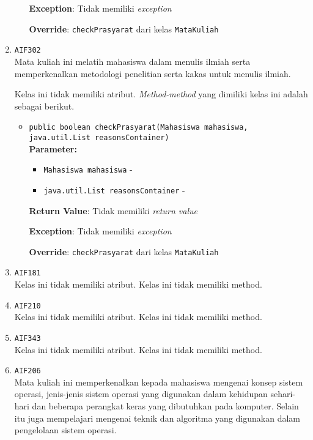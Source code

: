 \documentclass{article}
\begin{document}
\begin{enumerate}
\begin{itemize}
\textbf{Exception}: Tidak memiliki \textit{exception}

\textbf{Override}: \texttt{checkPrasyarat} dari kelas \texttt{MataKuliah}

\end{itemize}
\item \texttt{AIF302}\\ 
Mata kuliah ini melatih mahasiswa dalam menulis ilmiah serta memperkenalkan
 metodologi penelitian serta kakas untuk menulis ilmiah.

Kelas ini tidak memiliki atribut. \textit{Method-method} yang dimiliki kelas ini adalah sebagai berikut.
\begin{itemize}
\item \texttt{public boolean checkPrasyarat(Mahasiswa mahasiswa, java.util.List reasonsContainer)}\\ 


\textbf{Parameter:}\begin{itemize}
\item \texttt{Mahasiswa mahasiswa} - 
\item \texttt{java.util.List reasonsContainer} - 
\end{itemize}
\textbf{Return Value}: Tidak memiliki \textit{return value}

\textbf{Exception}: Tidak memiliki \textit{exception}

\textbf{Override}: \texttt{checkPrasyarat} dari kelas \texttt{MataKuliah}

\end{itemize}
\item \texttt{AIF181}\\ 


Kelas ini tidak memiliki atribut. Kelas ini tidak memiliki method. \item \texttt{AIF210}\\ 


Kelas ini tidak memiliki atribut. Kelas ini tidak memiliki method. \item \texttt{AIF343}\\ 


Kelas ini tidak memiliki atribut. Kelas ini tidak memiliki method. \item \texttt{AIF206}\\ 
Mata kuliah ini memperkenalkan kepada mahasiswa mengenai konsep sistem 
 operasi, jenis-jenis sistem operasi yang digunakan dalam kehidupan 
 sehari-hari dan beberapa perangkat keras yang dibutuhkan pada komputer. 
 Selain itu juga mempelajari mengenai teknik dan algoritma yang digunakan 
 dalam pengelolaan sistem operasi.


\end{enumerate}
\end{document}
